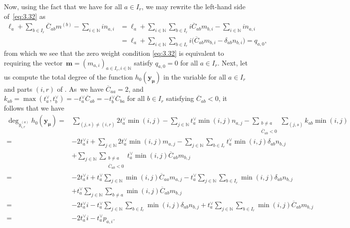 \documentclass[10pt,a4paper]{amsart}
\numberwithin{equation}{section}
\begin{document}
Now, using the fact that we have  for all $a\in I_r$, we may rewrite the left-hand side of~\eqref{eq:3.32} as
\begin{align*}
\ell_a+\sum_{b\in I_r}\overline{C}_{ab} m^{(b)}-\sum_{i\in \mathbb{N}}in_{a,i}
&=\ell_a+\sum_{i\in\mathbb{N}}\sum_{b\in I_r}i\overline{C}_{ ab} m_{b,i}-\sum_{i\in\mathbb{N}}in_{a,i}\\
&=\ell_a+\sum_{i\in\mathbb{N}}\sum_{b\in I_r}i\bigl(\overline{C}_{ ab} m_{b,i}-\delta_{ab}n_{b,i}\bigr)=q_{a,0},
\end{align*}
from which we see that the zero weight condition \eqref{eq:3.32} is equivalent to requiring the vector~${\mathbf{m}=(m_{a,i})_{a\in I_r,i\in\mathbb{N}}}$ satisfy $q_{a,0}=0$ for all $a\in I_r$.
Next, let us compute the total degree  of the function $h_0(\mathbf{ y}_{\bm{\mu}})$ in the variable  for all $a\in I_r$ and parts $(i,r)$ of . As~we have $\overline{C}_{aa}=2$, and $k_{ab}=\max(t_a^{\vee},t_b^{\vee})=-t_a^{\vee}\overline{C}_{ab}=-t_b^{\vee}\overline{C}_{ba}$ for all $b\in I_r$ satisfying $\overline{C}_{ab}<0$, it follows that we have
\begin{align}
\deg_{y_{i,r}^{(a)}} h_0(\mathbf{y}_{\bm{\mu}})
={}&\sum_{(j,s)\neq(i,r)}2t_a^{\vee}\min(i,j)-\sum_{j\in\mathbb{N}} t_a^{\vee}\min(i,j)n_{a,j}-\sum_{\substack{b\neq a\\ \overline{C}_{ab}<0}}\sum_{(j,s)}k_{ab}\min(i,j)\nonumber\\
={}&-2t_a^{\vee}i+\sum_{j\in\mathbb{N}}2t_a^{\vee}\min(i,j)m_{a,j}-\sum_{j\in\mathbb{N}}\sum_{b\in I_r}t_a^{\vee}\min(i,j)\delta_{ab}n_{b,j}\nonumber\\
&+\sum_{j\in\mathbb{N}}\sum_{\substack{b\neq a\\ \overline{C}_{ab}<0}}t_a^{\vee}\min(i,j)\overline{C}_{ab}m_{b,j} \nonumber\\
={}&-2t_a^{\vee}i+t_a^{\vee}\sum_{j\in\mathbb{N}}\min(i,j)\overline{C}_{aa}m_{a,j}-t_a^{\vee}\sum_{j\in\mathbb{N}}\sum_{b\in I_r}\min(i,j)\delta_{ab}n_{b,j}\nonumber\\
&+t_a^{\vee}\sum_{j\in\mathbb{N}}\sum_{b\neq a}\min(i,j) \overline{C}_{ab}m_{b,j}\nonumber\\
={}&-2t_a^{\vee}i-t_a^{\vee}\sum_{j\in\mathbb{N}}\sum_{b\in I_r}\min(i,j)\delta_{ab}n_{b,j}+t_a^{\vee}\sum_{j\in\mathbb{N}}\sum_{b\in I_r}\min(i,j)\overline{C}_{ab}m_{b,j}\nonumber\\
={}&-2t_a^{\vee}i-t_a^{\vee}p_{a,i}.\label{eq:3.50}
\end{align}
\end{document}
